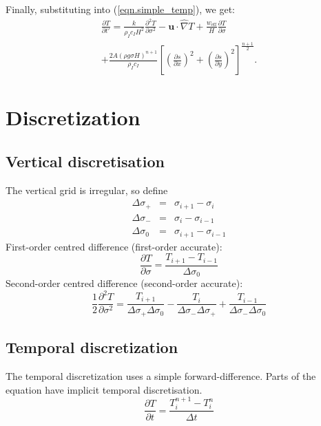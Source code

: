 \documentclass[10pt,english,a4paper]{article}
\newcommand{\diffn}[2]{\ensuremath{\frac{\partial #1}{\partial #2}}}
\begin{document}
Finally, substituting into
(\ref{eqn.simple_temp}), we get:
%
\begin{multline}
\frac{\partial T}{\partial t'} = \frac{k}{\rho_I c_I
  H^2}\frac{\partial^2 T}{\partial \sigma^2}
  - \mathbf{u}\cdot\hat{\nabla}T
  + \frac{w_{\mathrm{eff}}}{H}\frac{\partial T}{\partial
  \sigma}\\
+\frac{2A(\rho g \sigma H)^{n+1}}{\rho_I
  c_I}\left[\left(\diffn{s}{x}\right)^2+\left(\diffn{s}{y}\right)^2\right]^{\frac{n+1}{2}}. 
\label{eqn.final_temp}
\end{multline}
%
\section{Discretization}
%
\subsection{Vertical discretisation}
%
The vertical grid is irregular, so define
%
\begin{eqnarray}
\Delta\sigma_{+} & = & \sigma_{i+1}-\sigma_{i}\\
\Delta\sigma_{-} & = & \sigma_{i}-\sigma_{i-1}\\
\Delta\sigma_{0} & = & \sigma_{i+1}-\sigma_{i-1}
\end{eqnarray}
%
First-order centred difference (first-order accurate):
%
\begin{equation}
\frac{\partial T}{\partial \sigma} = \frac{T_{i+1}-T_{i-1}}{\Delta \sigma_0}
\end{equation}
%
Second-order centred difference (second-order accurate):
%
\begin{equation}
\frac{1}{2}\frac{\partial^2 T}{\partial \sigma^2} = \frac{T_{i+1}}{\Delta \sigma_{+}\Delta \sigma_{0}}
-\frac{T_{i}}{\Delta \sigma_{-}\Delta \sigma_{+}}
+\frac{T_{i-1}}{\Delta \sigma_{-}\Delta \sigma_{0}}
\end{equation}
%
\subsection{Temporal discretization}
%
The temporal discretization uses a simple forward-difference. Parts of
the equation have implicit temporal discretisation.
%
\begin{equation}
\frac{\partial T}{\partial t}=\frac{T_{i}^{n+1}-T_{i}^{n}}{\Delta t}
\end{equation}
%
\end{document}

